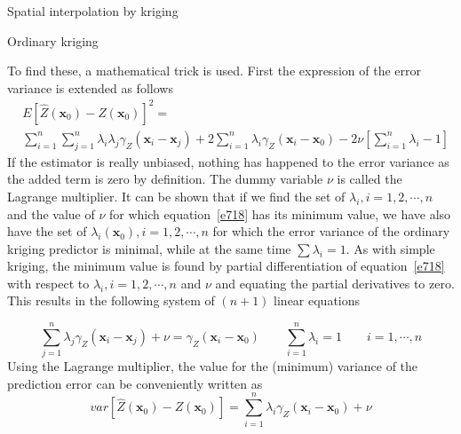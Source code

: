 \documentclass[8pt]{beamer}
\renewcommand{\emph}[1]{\textcolor{myorange}{#1}}
\begin{document}
 \begin{frame}{Spatial interpolation by kriging}
     \begin{block}{Ordinary kriging}
    \end{block}
To find these, a mathematical trick is used. First the expression of the error variance is extended as follows
    \begin{equation}
        \begin{aligned}
            & E[\hat{Z}(\mathbf{x}_0) - Z(\mathbf{x}_0)]^2 = \\ 
            &\sum_{i=1}^n \sum_{j=1}^n \lambda_i \lambda_j \gamma_Z (\mathbf{x}_i - \mathbf{x}_j) + 2\sum_{i=1}^n \lambda_i \gamma_Z (\mathbf{x}_i - \mathbf{x}_0) - 2\nu\left[\sum_{i=1}^n \lambda_i - 1 \right] 
        \end{aligned}
        \label{e718}
    \end{equation}
    If the estimator is really \emph{unbiased}, nothing has happened to the \emph{error variance} as the added term is zero by definition. The dummy variable $\nu$ is called the \alert{Lagrange multiplier}. It can be shown that if we find the set of $\lambda_i, i=1,2,\cdots, n$ and the value of $\nu$ for which equation~\ref{e718} has its minimum value, we have also have the set of $\lambda_i (\mathbf{x}_0), i=1,2,\cdots,n$ for which the \emph{error variance} of the \emph{ordinary kriging predictor} is minimal, while at the same time $\sum \lambda_i =1$. As with \emph{simple kriging}, the minimum value is found by partial differentiation of equation~\ref{e718} with respect to $\lambda_i, i=1,2,\cdots, n$  and $\nu$ and equating the partial derivatives to zero. This results in the following system of $(n + 1)$ linear equations

    \begin{equation}
        \sum_{j=1}^n \lambda_j \gamma_Z(\mathbf{x}_i - \mathbf{x}_j ) +  \nu = \gamma_Z (\mathbf{x}_i - \mathbf{x}_0) \quad \quad \sum_{i=1}^n \lambda_i = 1 \quad \quad i=1,\cdots,n
        \label{e719}
    \end{equation}
    Using the \emph{Lagrange multiplier}, the value for the (minimum) variance of the \emph{prediction error} can be conveniently written as
    \vspace{-5pt}
    \begin{equation}
        var[\hat{Z}(\mathbf{x}_0) - Z(\mathbf{x}_0)] = \sum_{i=1}^n \lambda_i \gamma_Z (\mathbf{x}_i - \mathbf{x}_0) + \nu 
        \label{e720}
    \end{equation}
   \end{frame}
\end{document}
